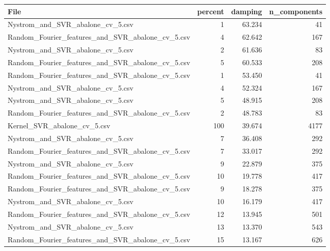 \begin{tabularx}{\textwidth}{lrrr}
\toprule
                                            File &  percent &  damping &  n\_components \\
\midrule
                Nystrom\_and\_SVR\_abalone\_cv\_5.csv &        1 &   63.234 &            41 \\
Random\_Fourier\_features\_and\_SVR\_abalone\_cv\_5.csv &        4 &   62.642 &           167 \\
                Nystrom\_and\_SVR\_abalone\_cv\_5.csv &        2 &   61.636 &            83 \\
Random\_Fourier\_features\_and\_SVR\_abalone\_cv\_5.csv &        5 &   60.533 &           208 \\
Random\_Fourier\_features\_and\_SVR\_abalone\_cv\_5.csv &        1 &   53.450 &            41 \\
                Nystrom\_and\_SVR\_abalone\_cv\_5.csv &        4 &   52.324 &           167 \\
                Nystrom\_and\_SVR\_abalone\_cv\_5.csv &        5 &   48.915 &           208 \\
Random\_Fourier\_features\_and\_SVR\_abalone\_cv\_5.csv &        2 &   48.783 &            83 \\
                     Kernel\_SVR\_abalone\_cv\_5.csv &      100 &   39.674 &          4177 \\
                Nystrom\_and\_SVR\_abalone\_cv\_5.csv &        7 &   36.408 &           292 \\
Random\_Fourier\_features\_and\_SVR\_abalone\_cv\_5.csv &        7 &   33.017 &           292 \\
                Nystrom\_and\_SVR\_abalone\_cv\_5.csv &        9 &   22.879 &           375 \\
Random\_Fourier\_features\_and\_SVR\_abalone\_cv\_5.csv &       10 &   19.778 &           417 \\
Random\_Fourier\_features\_and\_SVR\_abalone\_cv\_5.csv &        9 &   18.278 &           375 \\
                Nystrom\_and\_SVR\_abalone\_cv\_5.csv &       10 &   16.179 &           417 \\
Random\_Fourier\_features\_and\_SVR\_abalone\_cv\_5.csv &       12 &   13.945 &           501 \\
                Nystrom\_and\_SVR\_abalone\_cv\_5.csv &       13 &   13.370 &           543 \\
Random\_Fourier\_features\_and\_SVR\_abalone\_cv\_5.csv &       15 &   13.167 &           626 \\

\end{tabularx}
